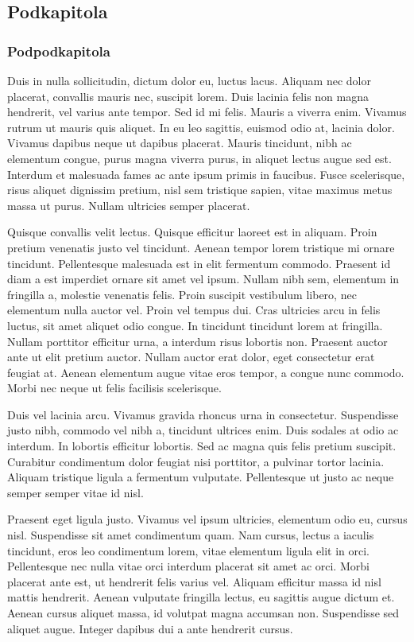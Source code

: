 \documentclass{article}
\begin{document}
	\subsection{Podkapitola}
	\subsubsection{Podpodkapitola}
	
	Duis in nulla sollicitudin, dictum dolor eu, luctus lacus. Aliquam nec dolor placerat, convallis mauris nec, suscipit lorem. Duis lacinia felis non magna hendrerit, vel varius ante tempor. Sed id mi felis. Mauris a viverra enim. \mbox{Vivamus} rutrum ut mauris quis aliquet. In eu leo sagittis, euismod odio at, lacinia dolor. Vivamus dapibus neque ut dapibus placerat. Mauris tincidunt, nibh ac elementum congue, purus magna viverra purus, in aliquet lectus augue sed est. Interdum et malesuada fames ac ante ipsum primis in faucibus. Fusce scelerisque, risus aliquet dignissim pretium, nisl sem tristique sapien, vitae maximus metus massa ut purus. Nullam ultricies semper placerat.
	
	Quisque convallis velit lectus. Quisque efficitur laoreet est in aliquam. Proin pretium venenatis justo vel tincidunt. Aenean tempor lorem tristique mi ornare tincidunt. Pellentesque malesuada est in elit fermentum commodo. Praesent id diam a est imperdiet ornare sit amet vel ipsum. Nullam nibh sem, elementum in fringilla a, molestie venenatis felis. Proin suscipit vestibulum libero, nec elementum nulla auctor vel. Proin vel tempus dui. Cras ultricies arcu in felis luctus, sit amet aliquet odio congue. In tincidunt tincidunt lorem at fringilla. Nullam porttitor efficitur urna, a interdum risus lobortis non. Praesent auctor ante ut elit pretium auctor. Nullam auctor erat dolor, eget consectetur erat feugiat at. Aenean elementum augue vitae eros tempor, a congue nunc commodo. Morbi nec neque ut felis facilisis scelerisque.
	
	Duis vel lacinia arcu. Vivamus gravida rhoncus urna in consectetur. Suspendisse justo nibh, commodo vel nibh a, tincidunt ultrices enim. Duis sodales at odio ac interdum. In lobortis efficitur lobortis. Sed ac magna quis felis pretium suscipit. Curabitur condimentum dolor feugiat nisi porttitor, a pulvinar tortor lacinia. Aliquam tristique ligula a fermentum vulputate. Pellentesque ut justo ac neque semper semper vitae id nisl.
	
	Praesent eget ligula justo. Vivamus vel ipsum ultricies, elementum odio eu, cursus nisl. Suspendisse sit amet condimentum quam. Nam cursus, lectus a iaculis tincidunt, eros leo condimentum lorem, vitae elementum ligula elit in orci. Pellentesque nec nulla vitae orci interdum placerat sit amet ac orci. Morbi placerat ante est, ut hendrerit felis varius vel. Aliquam efficitur massa id nisl mattis hendrerit. Aenean vulputate fringilla lectus, eu sagittis augue dictum et. Aenean cursus aliquet massa, id volutpat magna accumsan non. Suspendisse sed aliquet augue. Integer dapibus dui a ante hendrerit cursus.
	
\end{document}
